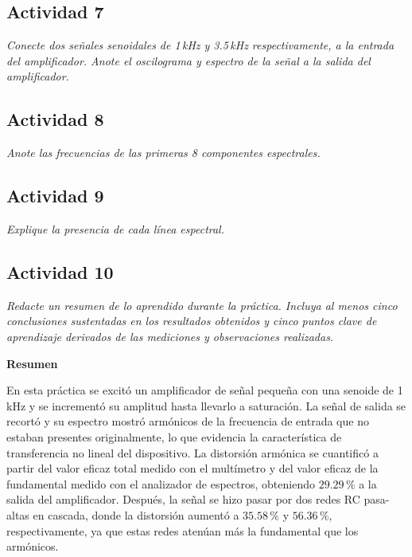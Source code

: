 \documentclass[12pt]{article}
\begin{document}
\subsection{Actividad 7}

\textit{Conecte dos señales senoidales de 1\,kHz y 3.5\,kHz respectivamente, a la entrada del amplificador. Anote el oscilograma y espectro de la señal a la salida del amplificador.}


\subsection{Actividad 8}

\textit{Anote las frecuencias de las primeras 8 componentes espectrales.}


\subsection{Actividad 9}

\textit{Explique la presencia de cada línea espectral.}


\subsection{Actividad 10}

\textit{Redacte un resumen de lo aprendido durante la práctica. Incluya al menos cinco conclusiones sustentadas en los resultados obtenidos y cinco puntos clave de aprendizaje derivados de las mediciones y observaciones realizadas.}

\textbf{Resumen}

En esta práctica se excitó un amplificador de señal pequeña con una senoide de 1\,kHz y se incrementó su amplitud hasta llevarlo a saturación. La señal de salida se recortó y su espectro mostró armónicos de la frecuencia de entrada que no estaban presentes originalmente, lo que evidencia la característica de transferencia no lineal del dispositivo. La distorsión armónica se cuantificó a partir del valor eficaz total medido con el multímetro y del valor eficaz de la fundamental medido con el analizador de espectros, obteniendo $29.29\,\%$ a la salida del amplificador. Después, la señal se hizo pasar por dos redes RC pasa-altas en cascada, donde la distorsión aumentó a $35.58\,\%$ y $56.36\,\%$, respectivamente, ya que estas redes atenúan más la fundamental que los armónicos.
\end{document}
